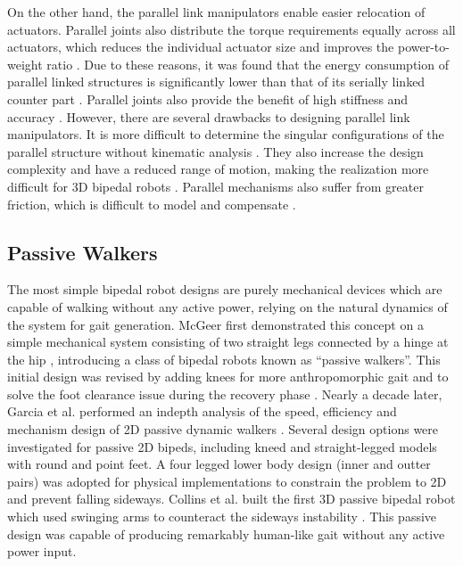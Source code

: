 On the other hand, the parallel link manipulators \cite{Merlet2006} enable easier relocation of actuators. Parallel joints also distribute the torque requirements equally across all actuators, which reduces the individual actuator size and improves the power-to-weight ratio \cite{Konno2002}. Due to these reasons, it was found that the energy consumption of parallel linked structures is significantly lower than that of its serially linked counter part \cite{Morisawa2000}. Parallel joints also provide the benefit of high stiffness and accuracy \cite{Sellaouti2005}. However, there are several drawbacks to designing parallel link manipulators. It is more difficult to determine the singular configurations of the parallel structure without kinematic analysis \cite{Sellaouti2005}. They also increase the design complexity and have a reduced range of motion, making the realization more difficult for 3D bipedal robots \cite{Lohmeier2006}. Parallel mechanisms also suffer from greater friction, which is difficult to model and compensate \cite{Yiu2001,Shang2008}.



\subsection{Passive Walkers} %
\label{sub:related_passive_designs}
The most simple bipedal robot designs are purely mechanical devices which are capable of walking without any active power, relying on the natural dynamics of the system for gait generation. McGeer first demonstrated this concept on a simple mechanical system consisting of two straight legs connected by a hinge at the hip \cite{McGeer:1990uk}, introducing a class of bipedal robots known as ``passive walkers''. This initial design was revised by adding knees for more anthropomorphic gait and to solve the foot clearance issue during the recovery phase \cite{McGeer:1990hh}. Nearly a decade later, Garcia et al. performed an indepth analysis of the speed, efficiency and mechanism design of 2D passive dynamic walkers \cite{Garcia:2000kv}. Several design options were investigated for passive 2D bipeds, including kneed and straight-legged models with round and point feet. A four legged lower body design (inner and outter pairs) was adopted for physical implementations to constrain the problem to 2D and prevent falling sideways. Collins et al. built the first 3D passive bipedal robot which used swinging arms to counteract the sideways instability \cite{Collins:2001jq}. This passive design was capable of producing remarkably human-like gait without any active power input. 


